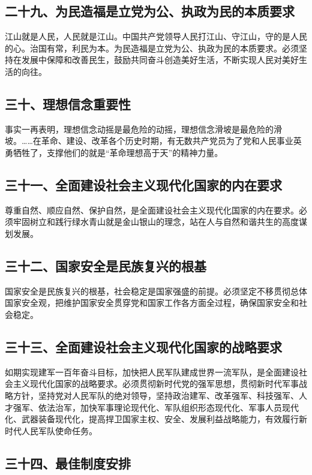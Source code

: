 \documentclass[UTF8,11pt,a4paper]{ctexart}
\begin{document}
\subsection*{二十九、为民造福是立党为公、执政为民的本质要求}

江山就是人民，人民就是江山。中国共产党领导人民打江山、守江山，守的是人民的心。治国有常，利民为本。为民造福是立党为公、执政为民的本质要求。必须坚持在发展中保障和改善民生，鼓励共同奋斗创造美好生活，不断实现人民对美好生活的向往。

\subsection*{三十、理想信念重要性}

事实一再表明，理想信念动摇是最危险的动摇，理想信念滑坡是最危险的滑坡。……在革命、建设、改革各个历史时期，有无数共产党员为了党和人民事业英勇牺牲了，支撑他们的就是“革命理想高于天”的精神力量。

\subsection*{三十一、全面建设社会主义现代化国家的内在要求}

尊重自然、顺应自然、保护自然，是全面建设社会主义现代化国家的内在要求。必须牢固树立和践行绿水青山就是金山银山的理念，站在人与自然和谐共生的高度谋划发展。

\subsection*{三十二、国家安全是民族复兴的根基}

国家安全是民族复兴的根基，社会稳定是国家强盛的前提。必须坚定不移贯彻总体国家安全观，把维护国家安全贯穿党和国家工作各方面全过程，确保国家安全和社会稳定。

\subsection*{三十三、全面建设社会主义现代化国家的战略要求}

如期实现建军一百年奋斗目标，加快把人民军队建成世界一流军队，是全面建设社会主义现代化国家的战略要求。必须贯彻新时代党的强军思想，贯彻新时代军事战略方针，坚持党对人民军队的绝对领导，坚持政治建军、改革强军、科技强军、人才强军、依法治军，加快军事理论现代化、军队组织形态现代化、军事人员现代化、武器装备现代化，提高捍卫国家主权、安全、发展利益战略能力，有效履行新时代人民军队使命任务。

\subsection*{三十四、最佳制度安排}
\end{document}
